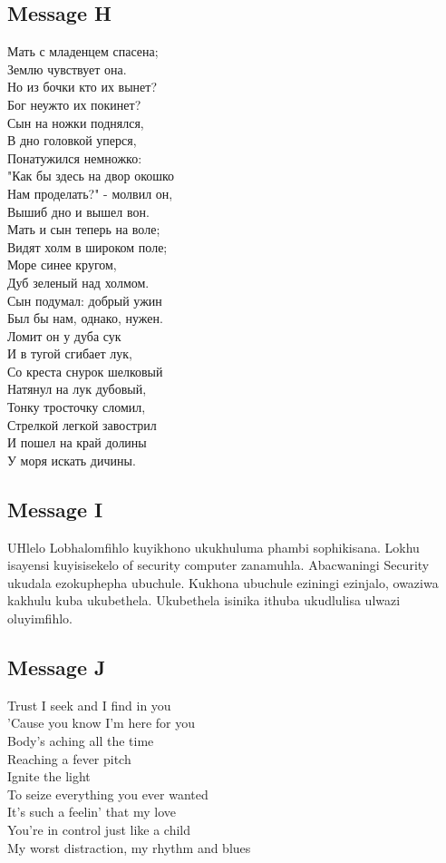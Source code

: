 \documentclass[a4paper,10pt]{article}
\begin{document}
\begin{appendices}
\subsection{Message H}
Мать с младенцем спасена;\\
Землю чувствует она.\\
Но из бочки кто их вынет?\\
Бог неужто их покинет?\\
Сын на ножки поднялся,\\
В дно головкой уперся,\\
Понатужился немножко:\\
"Как бы здесь на двор окошко\\
Нам проделать?" - молвил он,\\
Вышиб дно и вышел вон.\\
Мать и сын теперь на воле;\\
Видят холм в широком поле;\\
Море синее кругом,\\
Дуб зеленый над холмом.\\
Сын подумал: добрый ужин\\
Был бы нам, однако, нужен.\\
Ломит он у дуба сук\\
И в тугой сгибает лук,\\
Со креста снурок шелковый\\
Натянул на лук дубовый,\\
Тонку тросточку сломил,\\
Стрелкой легкой завострил\\
И пошел на край долины\\
У моря искать дичины.\\

\subsection{Message I}
UHlelo Lobhalomfihlo kuyikhono ukukhuluma phambi sophikisana. Lokhu isayensi kuyisisekelo of \mbox security computer zanamuhla. Abacwaningi Security ukudala ezokuphepha ubuchule. Kukhona ubuchule eziningi ezinjalo, owaziwa kakhulu kuba ukubethela. Ukubethela isinika ithuba ukudlulisa ulwazi \mbox oluyimfihlo.

\subsection{Message J}
Trust I seek and I find in you\\
'Cause you know I'm here for you\\
Body's aching all the time\\
Reaching a fever pitch\\
Ignite the light\\
To seize everything you ever wanted\\
It's such a feelin' that my love\\
You're in control just like a child\\
My worst distraction, my rhythm and blues\\


\end{appendices}

\newpage



\end{document}
